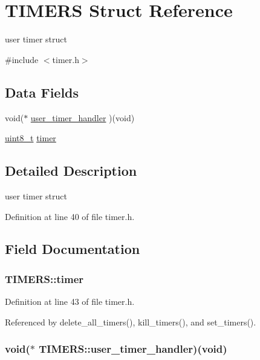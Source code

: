 \hypertarget{structTIMERS}{\section{T\-I\-M\-E\-R\-S Struct Reference}
\label{structTIMERS}
}


user timer struct  




{\ttfamily \#include $<$timer.\-h$>$}

\subsection*{Data Fields}
\begin{DoxyCompactItemize}
\item 
void($\ast$ \hyperlink{structTIMERS_a66bb89d328cf2c3f1b9362d7ea207c29}{user\-\_\-timer\-\_\-handler} )(void)
\item 
\hyperlink{send_8c_aba7bc1797add20fe3efdf37ced1182c5}{uint8\-\_\-t} \hyperlink{structTIMERS_a0b10fdb7b0e6b1d3ca49718f47c4514d}{timer}
\end{DoxyCompactItemize}


\subsection{Detailed Description}
user timer struct 

Definition at line 40 of file timer.\-h.



\subsection{Field Documentation}
\hypertarget{structTIMERS_a0b10fdb7b0e6b1d3ca49718f47c4514d}{
\subsubsection[{timer}]{ T\-I\-M\-E\-R\-S\-::timer}}\label{structTIMERS_a0b10fdb7b0e6b1d3ca49718f47c4514d}


Definition at line 43 of file timer.\-h.



Referenced by delete\-\_\-all\-\_\-timers(), kill\-\_\-timers(), and set\-\_\-timers().

\hypertarget{structTIMERS_a66bb89d328cf2c3f1b9362d7ea207c29}{
\subsubsection[{user\-\_\-timer\-\_\-handler}]{\setlength{\rightskip}{0pt plus 5cm}void($\ast$ T\-I\-M\-E\-R\-S\-::user\-\_\-timer\-\_\-handler)(void)}}\label{structTIMERS_a66bb89d328cf2c3f1b9362d7ea207c29}


